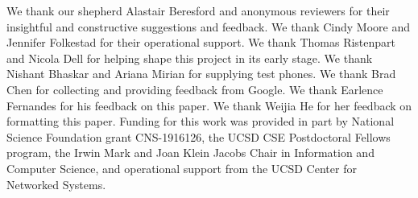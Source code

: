 \begin{acks}
We thank our shepherd Alastair Beresford and anonymous reviewers for their insightful and
constructive suggestions and feedback. We thank Cindy Moore and Jennifer Folkestad for
their operational support. We thank Thomas Ristenpart and Nicola Dell for helping shape this project in its early stage. We thank Nishant Bhaskar and Ariana Mirian for supplying test phones.
We thank Brad Chen for collecting and providing feedback from Google. We thank Earlence Fernandes for his feedback on this paper. We thank Weijia He for her feedback on formatting this paper.
Funding for this work was provided in part by National Science
Foundation grant CNS-1916126,
the UCSD CSE
Postdoctoral Fellows program, the Irwin Mark and Joan Klein Jacobs
Chair in Information and Computer Science,
and operational support from the UCSD Center for Networked Systems.

\end{acks}
